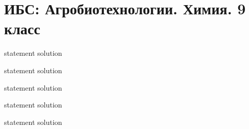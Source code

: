 \chapter{ИБС: Агробиотехнологии. Химия. 9 класс}

{statement}
{solution}

{statement}
{solution}

{statement}
{solution}

{statement}
{solution}

{statement}
{solution}